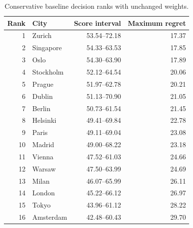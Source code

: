\begin{table}[!ht]\centering
\caption{Conservative baseline decision ranks with unchanged weights.}\label{tab:baseline}
\begin{tabular}{rlrr}\toprule
Rank & City & Score interval & Maximum regret\\\midrule
1 & Zurich & 53.54--72.18 & 17.37 \\
2 & Singapore & 54.33--63.53 & 17.85 \\
3 & Oslo & 54.30--63.90 & 17.89 \\
4 & Stockholm & 52.12--64.54 & 20.06 \\
5 & Prague & 51.97--62.78 & 20.21 \\
6 & Dublin & 51.13--70.90 & 21.05 \\
7 & Berlin & 50.73--61.54 & 21.45 \\
8 & Helsinki & 49.41--69.84 & 22.78 \\
9 & Paris & 49.11--69.04 & 23.08 \\
10 & Madrid & 49.00--68.22 & 23.18 \\
11 & Vienna & 47.52--61.03 & 24.66 \\
12 & Warsaw & 47.50--63.99 & 24.69 \\
13 & Milan & 46.07--65.99 & 26.11 \\
14 & London & 45.22--66.12 & 26.97 \\
15 & Tokyo & 43.96--61.12 & 28.22 \\
16 & Amsterdam & 42.48--60.43 & 29.70 \\
\bottomrule\end{tabular}\end{table}

